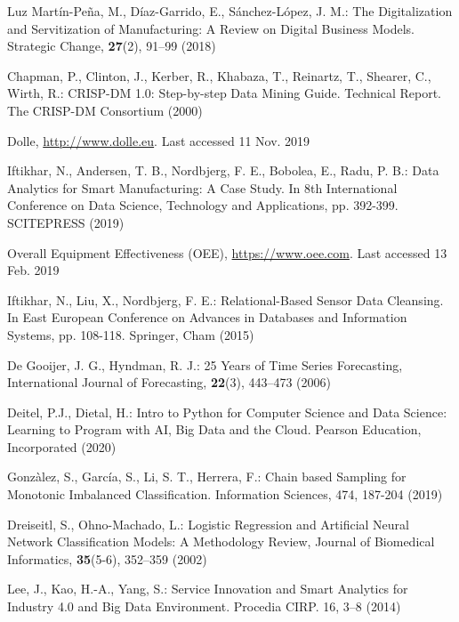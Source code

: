\documentclass[runningheads]{llncs}
\begin{document}
\begin{thebibliography}{8}

Luz Mart\'in-Pe\~na, M., D\'iaz-Garrido, E., S\'anchez-L\'opez, J. M.: The Digitalization and Servitization of Manufacturing: A Review on Digital Business Models. Strategic Change, \textbf{27}(2), 91--99 (2018)

Chapman, P., Clinton, J., Kerber, R., Khabaza, T., Reinartz, T., Shearer, C., Wirth, R.:
CRISP-DM 1.0: Step-by-step Data Mining Guide. Technical Report. The CRISP-DM Consortium (2000)

Dolle, \url{http://www.dolle.eu}. Last accessed 11 Nov. 2019


Iftikhar, N., Andersen, T. B., Nordbjerg, F. E., Bobolea, E., Radu, P. B.: Data Analytics for Smart Manufacturing: A Case Study. In 8th International Conference on Data Science, Technology and Applications, pp. 392-399. SCITEPRESS (2019)


Overall Equipment Effectiveness (OEE), \url{https://www.oee.com}. Last accessed 13 Feb. 2019




Iftikhar, N., Liu, X., Nordbjerg, F. E.: Relational-Based Sensor Data Cleansing. In East European Conference on Advances in Databases and Information Systems, pp. 108-118. Springer, Cham (2015)

 De Gooijer, J. G., Hyndman, R. J.:  25 Years of Time Series Forecasting, International Journal of Forecasting, \textbf{22}(3), 443--473 (2006)

Deitel, P.J., Dietal, H.: Intro to Python for Computer Science and Data Science: Learning to Program with AI, Big Data and the Cloud. Pearson Education, Incorporated (2020)

Gonz\`alez, S., Garc\'ia, S., Li, S. T., Herrera, F.: Chain based Sampling for Monotonic Imbalanced Classification. Information Sciences, 474, 187-204 (2019)

Dreiseitl, S., Ohno-Machado, L.: Logistic Regression and Artificial Neural Network Classification Models: A Methodology Review, Journal of Biomedical Informatics, \textbf{35}(5-6), 352--359 (2002)

Lee, J., Kao, H.-A., Yang, S.: Service Innovation and Smart Analytics for Industry 
4.0 and Big Data Environment. Procedia CIRP. 16, 3--8 (2014)


\end{thebibliography}
\end{document}
